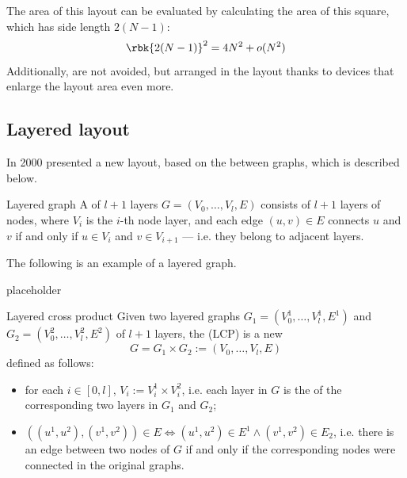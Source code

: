 \documentclass[a4paper, 12pt]{report}
\begin{document}

    The area of this layout can be evaluated by calculating the area of this  square, which has side length $2(N - 1)$: $$\rbk{2(N -1)}^2 = 4N^2 + o(N^2)$$ Additionally,  are not avoided, but arranged in the layout thanks to devices that enlarge the layout area even more.

    \subsection{Layered layout}

    In 2000 \textcite{seven} presented a new layout, based on the  between graphs, which is described below.

    \begin{frameddefn}{Layered graph}
        A  of $l + 1$ layers $G = (V_0, \ldots, V_l, E)$ consists of $l + 1$ layers of nodes, where $V_i$ is the $i$-th node layer, and each edge $(u, v) \in E$ connects $u$ and $v$ if and only if $u \in V_i$ and $v \in V_{i + 1}$ --- i.e. they belong to adjacent layers.
    \end{frameddefn}

    \begin{example}
        The following is an example of a layered graph.

        placeholder 
    \end{example}

    \begin{frameddefn}{Layered cross product}
        Given two layered graphs $G_1 = (V_0^1, \ldots, V_l^1, E^1)$ and $G_2 = (V_0^2, \ldots, V_l^2, E^2)$ of $l + 1$ layers, the  (LCP) is a new  $$G = G_1 \times G_2 := (V_0, \ldots, V_l, E)$$ defined as follows:

        \begin{itemize}
            \item for each $i \in [0, l]$, $V_i := V_i ^1 \times V_i^2$, i.e. each layer in $G$ is the  of the corresponding two layers in $G_1$ and $G_2$;
            \item $((u^1, u^2), (v^1, v^2)) \in E \iff (u^1, u^2) \in E^1 \land (v^1, v^2) \in E_2$, i.e. there is an edge between two nodes of $G$ if and only if the corresponding nodes were connected in the original graphs.
        \end{itemize}
    \end{frameddefn}
\end{document}
